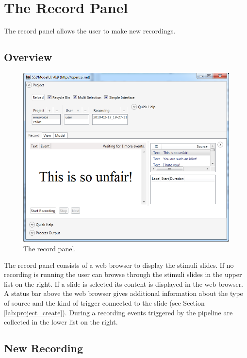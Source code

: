 \chapter{The Record Panel}\label{lab:record}

The record panel allows the user to make new recordings.

\section{Overview}\label{lab:record_overview}

\begin{figure}[h]
\begin{center}
\includegraphics[scale=0.5]{pics/record_gui.png}
\end{center}
\vspace{-0.5cm}
\caption{The record panel.}
\label{fig:record_gui}
\end{figure}

The record panel consists of a web browser to display the stimuli slides. If no recording is running the user can browse through the stimuli slides in the upper list on the right. If a slide is selected its content is displayed in the web browser. A status bar above the web browser gives additional information about the type of source and the kind of trigger connected to the slide (see Section \ref{lab:project_create}). During a recording events triggered by the pipeline are collected in the lower list on the right.

\section{New Recording}\label{lab:project_new}

